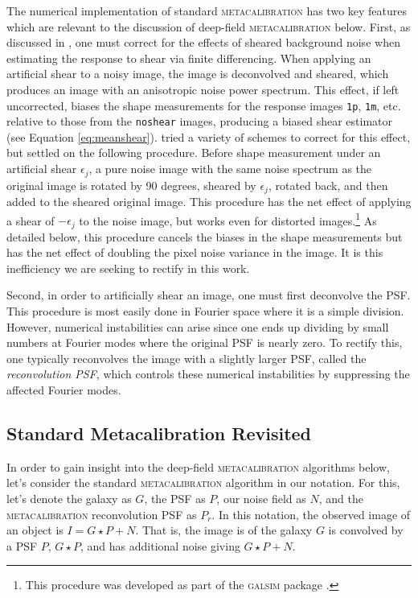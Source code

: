 \documentclass[twocolumn]{openjournal}
\makeatletter
\newcommand{\mcal}{\textsc{metacalibration}\@\xspace}
\newcommand{\noshear}{\texttt{noshear}\@\xspace}
\newcommand{\galsim}{\textsc{galsim}\@\xspace}
\makeatother
\begin{document}
The numerical implementation of standard \mcal has two key features which are relevant
to the discussion of deep-field \mcal below. First, as discussed in
\citet{SheldonMcal2017}, one must correct for the effects of sheared background noise
when estimating the response to shear via finite differencing. When applying an
artificial shear to a noisy image, the image is deconvolved and sheared,
which produces an image with an anisotropic noise power spectrum.
This effect, if left uncorrected, biases the shape measurements
for the response images \texttt{1p}, \texttt{1m}, etc. relative to those from the
\noshear images, producing a biased shear estimator (see Equation \ref{eq:meanshear}).
\citet{SheldonMcal2017} tried a
variety of schemes to correct for this effect, but settled on the following procedure.
Before shape measurement under an artificial shear $\epsilon_j$, a pure noise image with
the same noise spectrum as the original image is rotated by 90 degrees, sheared by
$\epsilon_j$, rotated back, and then added to the sheared original image. This procedure
has the net effect of applying a shear of $-\epsilon_j$ to the noise image, but
works even for distorted images.\footnote{This procedure was developed as part of the
\galsim package \citep{GALSIM2015}.} As detailed below, this procedure cancels the
biases in the shape measurements but has the net effect of doubling the
pixel noise variance in the image. It is this inefficiency we are seeking to rectify in
this work.

Second, in order to artificially shear an image, one must first deconvolve
the PSF. This procedure is most easily done in Fourier space where it is a simple
division. However, numerical instabilities can arise since one ends up dividing by small
numbers at Fourier modes where the original PSF is nearly zero. To rectify this, one
typically reconvolves the image with a slightly larger PSF, called the
\textit{reconvolution PSF}, which controls these numerical instabilities by suppressing
the affected Fourier modes.


\subsection{Standard Metacalibration Revisited}\label{sec:mcalagain}

In order to gain insight into the deep-field \mcal algorithms below, let's consider the
standard \mcal algorithm in our notation. For this, let's denote the galaxy as $G$, the
PSF as $P$, our noise field as $N$, and the \mcal reconvolution PSF as $P_r$. In this
notation, the observed image of an object is $I = G\star P + N$. That is, the image
is of the galaxy $G$ is convolved by a PSF $P$, $G\star P$, and has additional noise
giving $G\star P + N$.
\end{document}
